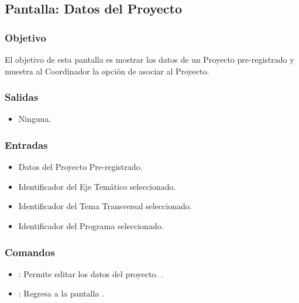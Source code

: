 \subsection{Pantalla: Datos del Proyecto}

\subsubsection{Objetivo}
El objetivo de esta pantalla es mostrar los datos de un Proyecto pre-registrado y muestra al Coordinador la opción de asociar al Proyecto.


\subsubsection{Salidas}
\begin{itemize}
\item Ninguna.
\end{itemize}

\subsubsection{Entradas}
\begin{itemize}
 \item Datos del Proyecto Pre-registrado. 
 \item Identificador del Eje Temático seleccionado.
 \item Identificador del Tema Transversal seleccionado.
 \item Identificador del Programa seleccionado.
\end{itemize}

\subsubsection{Comandos}
\begin{itemize}
 \item {}: Permite editar los datos del proyecto. .
 \item {}: Regresa a la pantalla .
\end{itemize}